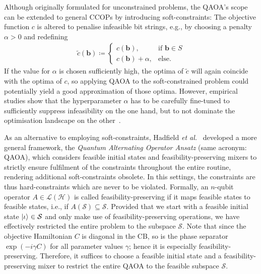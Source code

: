 \documentclass[10pt,conference]{IEEEtran}
\newcommand*{\hil}{\mathcal{H}}       %
\newcommand*{\solset}{S}              %
\newcommand*{\solspace}{\mathcal{S}}  %
\newcommand*{\lo}{\mathcal{L}}        %
\begin{document}
Although originally formulated for unconstrained problems, the QAOA's scope can be extended to general CCOPs by introducing soft-constraints:
The objective function $c$ is altered to penalise infeasible bit strings, e.g., by choosing a penalty $\alpha > 0$ and redefining
\begin{align}\label{equation:SoftConstraints}
    \tilde{c}(\bm{b}) \coloneqq \begin{cases}
        c(\bm{b}),& \text{if } \bm{b} \in \solset \\
        c(\bm{b}) + \alpha,& \text{else}.
    \end{cases}
\end{align}
If the value for $\alpha$ is chosen sufficiently high, the optima of $\tilde{c}$ will again coincide with the optima of $c$, so applying QAOA to the soft-constrained problem could potentially yield a good approximation of those optima.
However, empirical studies show that the hyperparameter $\alpha$ has to be carefully fine-tuned to sufficiently suppress infeasibility on the one hand, but to not dominate the optimisation landscape on the other~\cite{GrandRive2019KnapsackProblemVariantsOfQaoaForBatteryRevenueOptimisation}.

As an alternative to employing soft-constraints, Hadfield \textit{et al.}~\cite{Hadfield2019FromTheQuantumApproximateOptimizationAlgorithmToAQuantumAlternatingOperatorAnsatz} developed a more general framework, the \emph{Quantum Alternating Operator Ansatz} (same acronym: QAOA), which considers feasible initial states and feasibility-preserving mixers to strictly ensure fulfilment of the constraints throughout the entire routine, rendering additional soft-constraints obsolete.
In this settings, the constraints are thus hard-constraints which are never to be violated.
Formally, an $n$-qubit operator $A \in \lo(\hil)$ is called feasibility-preserving if it maps feasible states to feasible states, i.e., if $A(\solspace) \subseteq \solspace$.
Provided that we start with a feasible initial state $\ket{\iota} \in \solspace$ and only make use of feasibility-preserving operations, we have effectively restricted the entire problem to the subspace $\solspace$.
Note that since the objective Hamiltonian $C$ is diagonal in the CB, so is the phase separator $\exp(-i \gamma C)$ for all parameter values $\gamma$;
hence it is especially feasibility-preserving.
Therefore, it suffices to choose a feasible initial state and a feasibility-preserving mixer to restrict the entire QAOA to the feasible subspace $\solspace$.
\end{document}
